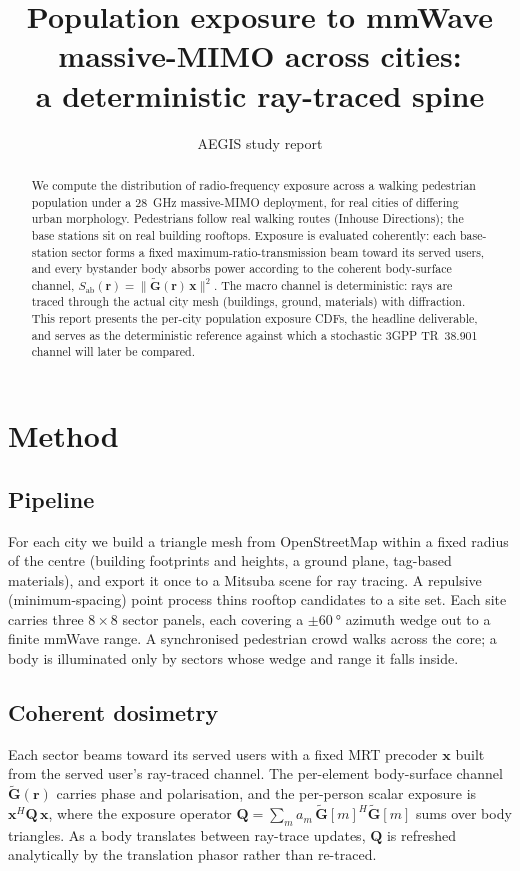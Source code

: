 \documentclass[10pt,journal]{IEEEtran}
\title{Population exposure to mmWave massive-MIMO across cities:\\
a deterministic ray-traced spine}
\author{AEGIS study report}
\begin{document}
\maketitle

\begin{abstract}
We compute the distribution of radio-frequency exposure across a walking
pedestrian population under a \SI{28}{\giga\hertz} massive-MIMO deployment, for
real cities of differing urban morphology. Pedestrians follow real walking
routes (Inhouse Directions); the base stations sit on real building rooftops.
Exposure is evaluated coherently:
each base-station sector forms a fixed maximum-ratio-transmission beam toward its
served users, and every bystander body absorbs power according to the coherent
body-surface channel, $S_\mathrm{ab}(\mathbf r) = \lVert \tilde{\mathbf
G}(\mathbf r)\,\mathbf x \rVert^2$. The macro channel is deterministic: rays are
traced through the actual city mesh (buildings, ground, materials) with
diffraction. This report presents the per-city population exposure CDFs, the
headline deliverable, and serves as the deterministic reference against which a
stochastic 3GPP TR~38.901 channel will later be compared.
\end{abstract}

\section{Method}

\subsection{Pipeline}
For each city we build a triangle mesh from OpenStreetMap within a fixed radius
of the centre (building footprints and heights, a ground plane, tag-based
materials), and export it once to a Mitsuba scene for ray tracing. A repulsive
(minimum-spacing) point process thins rooftop candidates to a site set. Each site
carries three \(8\times8\) sector panels, each covering a \(\pm\SI{60}{\degree}\)
azimuth wedge out to a finite mmWave range. A synchronised pedestrian crowd walks
across the core; a body is illuminated only by sectors whose wedge and range it
falls inside.

\subsection{Coherent dosimetry}
Each sector beams toward its served users with a fixed MRT precoder \(\mathbf x\)
built from the served user's ray-traced channel. The per-element body-surface
channel \(\tilde{\mathbf G}(\mathbf r)\) carries phase and polarisation, and the
per-person scalar exposure is \(\mathbf x^{H} \mathbf Q\, \mathbf x\), where the
exposure operator \(\mathbf Q = \sum_m a_m\, \tilde{\mathbf G}[m]^{H}
\tilde{\mathbf G}[m]\) sums over body triangles. As a body translates between
ray-trace updates, \(\mathbf Q\) is refreshed analytically by the translation
phasor rather than re-traced.
\end{document}
